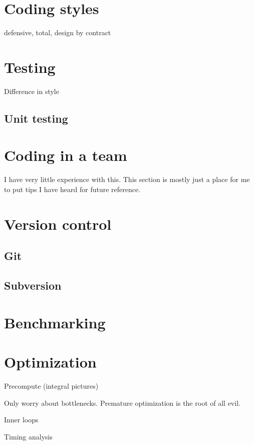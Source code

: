 \section{Coding styles}
defensive, total, 
design by contract
\section{Testing}
Difference in style
\subsection{Unit testing}
\section{Coding in a team}
I have very little experience with this. This section is mostly just a place for me to put tips I have heard for future reference.

\section{Version control}
\subsection{Git}
\subsection{Subversion}

\section{Benchmarking}
\section{Optimization}
Precompute (integral pictures)

Only worry about bottlenecks. Premature optimization is the root of all evil.

Inner loops

Timing analysis